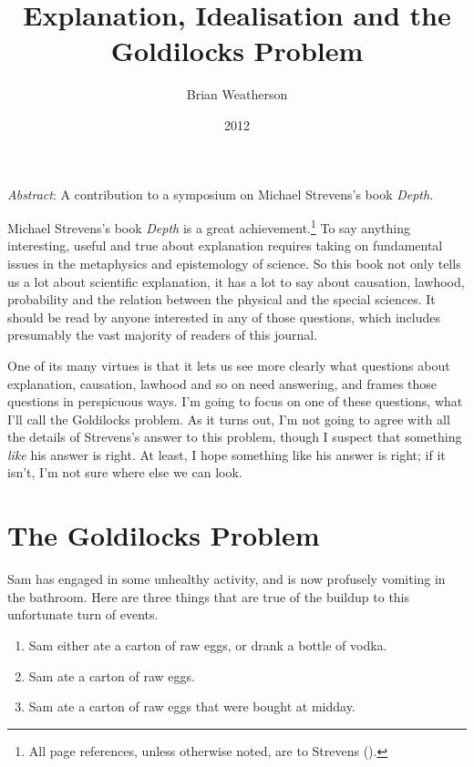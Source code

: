 \documentclass[
  11pt,
  letterpaper,
  DIV=11,
  numbers=noendperiod,
  twoside]{scrartcl}
\title{Explanation, Idealisation and the Goldilocks Problem}
\author{Brian Weatherson}
\date{2012}
\providecommand{\tightlist}{%
  \setlength{\itemsep}{0pt}\setlength{\parskip}{0pt}}
\renewenvironment{abstract}
 {\vspace{-1.25cm}
 \quotation\small\noindent\emph{Abstract}:}
 {\endquotation}
\begin{document}
\maketitle
\begin{abstract}
A contribution to a symposium on Michael Strevens's book \emph{Depth}.
\end{abstract}


Michael Strevens's book \emph{Depth} is a great achievement.\footnote{All
  page references, unless otherwise noted, are to Strevens
  ().} To say anything interesting,
useful and true about explanation requires taking on fundamental issues
in the metaphysics and epistemology of science. So this book not only
tells us a lot about scientific explanation, it has a lot to say about
causation, lawhood, probability and the relation between the physical
and the special sciences. It should be read by anyone interested in any
of those questions, which includes presumably the vast majority of
readers of this journal.

One of its many virtues is that it lets us see more clearly what
questions about explanation, causation, lawhood and so on need
answering, and frames those questions in perspicuous ways. I'm going to
focus on one of these questions, what I'll call the Goldilocks problem.
As it turns out, I'm not going to agree with all the details of
Strevens's answer to this problem, though I suspect that something
\emph{like} his answer is right. At least, I hope something like his
answer is right; if it isn't, I'm not sure where else we can look.

\section{The Goldilocks Problem}\label{the-goldilocks-problem}

Sam has engaged in some unhealthy activity, and is now profusely
vomiting in the bathroom. Here are three things that are true of the
buildup to this unfortunate turn of events.

\begin{enumerate}
\def\labelenumi{\arabic{enumi}.}
\tightlist
\item
  Sam either ate a carton of raw eggs, or drank a bottle of vodka.
\item
  Sam ate a carton of raw eggs.
\item
  Sam ate a carton of raw eggs that were bought at midday.
\end{enumerate}
\end{document}
